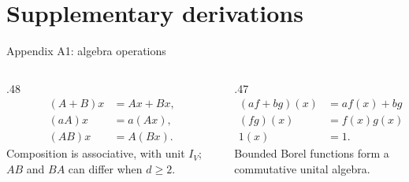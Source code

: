 \section{Supplementary derivations}

\begin{frame}[t]{Appendix A1: algebra operations}
\hypertarget{app:algebras}{}
\begin{columns}[T,onlytextwidth]
  \begin{column}{.48\textwidth}
    \begin{equation*}
      \begin{aligned}
        (A+B)x&=Ax+Bx,\\
        (aA)x&=a(Ax),\\
        (AB)x&=A(Bx).
      \end{aligned}
    \end{equation*}
    Composition is associative, with unit $I_V$;
    $AB$ and $BA$ can differ when $d\geq2$.
    \par\medskip
  \end{column}
  \begin{column}{.47\textwidth}
    \begin{equation*}
      \begin{aligned}
        (af+bg)(x)&=af(x)+bg(x),\\
        (fg)(x)&=f(x)g(x),\\
        1(x)&=1.
      \end{aligned}
    \end{equation*}
    Bounded Borel functions form a commutative unital algebra.
    \par\medskip
  \end{column}
\end{columns}
\end{frame}

